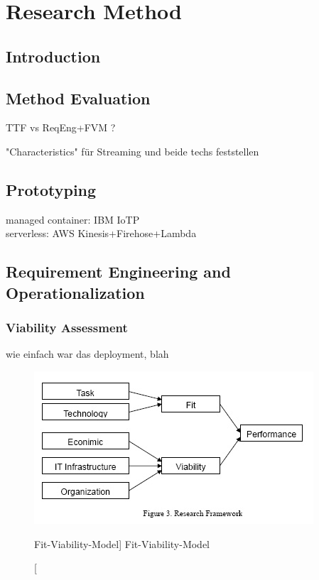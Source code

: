 \chapter{Research Method}


\section{Introduction}


\section{Method Evaluation}

TTF vs ReqEng+FVM ?

"Characteristics" für Streaming und beide techs feststellen


\section{Prototyping}

managed container: IBM IoTP\\
serverless: AWS Kinesis+Firehose+Lambda

\section{Requirement Engineering and Operationalization}\label{sec:operationalization}

\subsection{Viability Assessment}

wie einfach war das deployment, blah

\begin{figure}[ht]
    \includegraphics[width=0.7\linewidth]{images/methodology/fvm.jpg}\centering
    \caption
    [Fit-Viability-Model]
    {Fit-Viability-Model \cite{Liang2007AdoptionModel}}
\end{figure}

